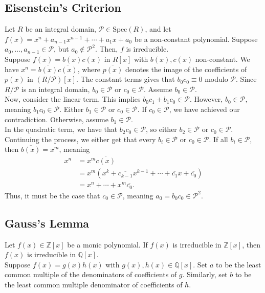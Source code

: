 \documentclass[10pt]{extarticle}
\newcommand{\Q}{\mathbb{Q}}
\newcommand{\Z}{\mathbb{Z}}
\begin{document}
  \subsection{Eisenstein's Criterion}%
  Let $R$ be an integral domain, $\mathcal{P}\in \text{Spec}(R)$, and let $f(x) = x^n + a_{n-1}x^{n-1} + \cdots + a_1x + a_0$ be a non-constant polynomial. Suppose $a_0,\dots,a_{n-1}\in \mathcal{P}$, but $a_0\notin \mathcal{P}^2$. Then, $f$ is irreducible.\\

  Suppose $f(x) = b(x)c(x)$ in $R[x]$ with $b(x),c(x)$ non-constant. We have $x^n = \overline{b(x)}\overline{c(x)}$, where $\overline{p(x)}$ denotes the image of the coefficients of $p(x)$ in $(R/\mathcal{P})[x]$. The constant terms gives that $b_0c_0 \equiv 0 $ modulo $\mathcal{P}$. Since $R/\mathcal{P}$ is an integral domain, $b_0\in \mathcal{P}$ or $c_0\in \mathcal{P}$. Assume $b_0\in\mathcal{P}$.\\

  Now, consider the linear term. This implies $b_0c_1 + b_1c_0 \in \mathcal{P}$. However, $b_0\in \mathcal{P}$, meaning $b_1c_0\in \mathcal{P}$. Either $b_1\in \mathcal{P}$ or $c_0\in \mathcal{P}$. If $c_0\in \mathcal{P}$, we have achieved our contradiction. Otherwise, assume $b_1\in \mathcal{P}$.\\

  In the quadratic term, we have that $b_2c_0\in \mathcal{P}$, so either $b_2\in \mathcal{P}$ or $c_0\in \mathcal{P}$. Continuing the process, we either get that every $b_i\in \mathcal{P}$ or $c_0\in \mathcal{P}$. If all $b_i\in \mathcal{P}$, then $\overline{b(x)} = x^m$, meaning 
  \begin{align*}
    x^n &= x^m\overline{c(x)}\\
        &= x^m \left(x^k + \overline{c_{k-1}} x^{k-1} + \cdots + \overline{c_1}x + \overline{c_0}\right)\\
        &= x^n + \cdots + x^m \overline{c_0}.
  \end{align*}
  Thus, it must be the case that $c_0\in \mathcal{P}$, meaning $a_0 = b_0c_0 \in \mathcal{P}^2$.
  \subsection{Gauss's Lemma}%
  Let $f(x) \in \Z[x]$ be a monic polynomial. If $f(x)$ is irreducible in $\Z[x]$, then $f(x)$ is irreducible in $\Q[x]$.\\

  Suppose $f(x) = g(x)h(x)$ with $g(x),h(x)\in \Q[x]$. Set $a$ to be the least common multiple of the denominators of coefficients of $g$. Similarly, set $b$ to be the least common multiple denominator of coefficients of $h$.\\
\end{document}
